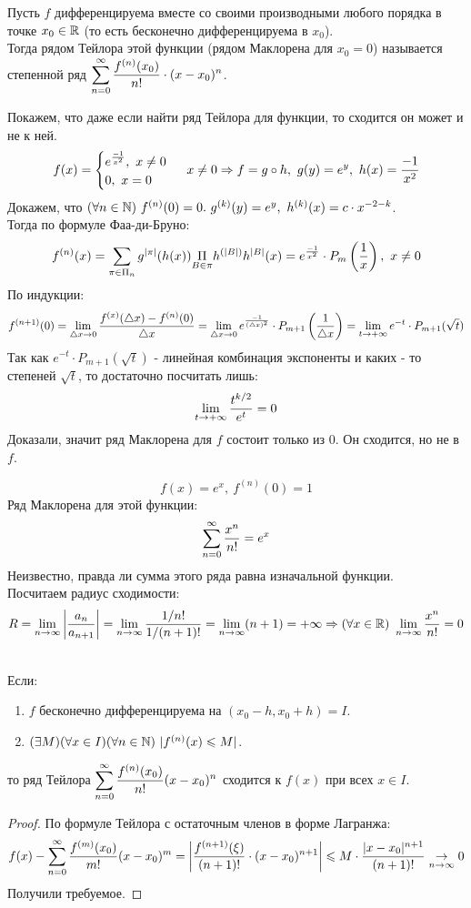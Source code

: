 \begin{definition}
	Пусть $f$ дифференцируема вместе со своими производными любого порядка в точке $x_0\in\mathbb{R}$ (то есть бесконечно дифференцируема в $x_0$). \\
	Тогда рядом Тейлора этой функции (рядом Маклорена для $x_0=0$) называется степенной ряд $\ds\ss[0]\frac{f^{(n)}(x_0)}{n!}\cdot(x-x_0)^n$.
\end{definition}
\begin{example}
	Покажем, что даже если найти ряд Тейлора для функции, то сходится он может и не к ней.
	\[f(x)=
	\begin{cases}
		e^{\frac{-1}{x^2}},\ x\neq0\\
		0,\ x=0
	\end{cases}
	\ x\neq0\Rightarrow f=g\circ h,\ g(y)=e^y,\ h(x)=\frac{-1}{x^2}
	\]
	Докажем, что $(\fa n\in\N)\ f^{(n)}(0)=0.\ g^{(k)}(y)=e^y,\ h^{(k)}(x)=c\cdot x^{-2-k}$.\\
	Тогда по формуле Фаа-ди-Бруно:
	\[f^{(n)}(x)=\sum_{\pi\in\Pi_n}g^{|\pi|}(h(x))\underset{B\in\pi}{\Pi}h^{(|B|)}h^{|B|}(x)=e^{\frac{-1}{x^2}}\cdot P_m\l(\frac1x\r),\ x\neq0\]
	По индукции:
	\begin{multline*}
		f^{(n+1)}(0)=\lim_{\tr x\ra0}\frac{f^{(x)}(\tr x)-f^{(n)}(0)}{\tr x}=\lim_{\tr x\ra0}e^{\frac{-1}{(\tr x)^2}}\cdot P_{m+1}\l(\frac{1}{\tr x}\r)=
		\lim_{t\ra+\i}e^{-t}\cdot P_{m+1}(\sqrt{t})
	\end{multline*}
	Так как $e^{-t}\cdot P_{m+1}(\sqrt{t})$ - линейная комбинация экспоненты и каких - то степеней $\sqrt{t}$, то достаточно посчитать лишь:
	\[\lim_{t\ra+\i}\frac{t^{k/2}}{e^t}=0\]
	Доказали, значит ряд Маклорена для $f$ состоит только из $0$. Он сходится, но не в $f$.
\end{example}
\begin{example}
	\[
	f(x)=e^x,\ f^{(n)}(0)=1
	\]
	Ряд Маклорена для этой функции:
	\[\ss[0]\frac{x^n}{n!}=e^x\]
	Неизвестно, правда ли сумма этого ряда равна изначальной функции.\\
	Посчитаем радиус сходимости:
	\[R=\lim_{n\ra\i}\l|\frac{a_n}{a_{n+1}}\r|=\lim_{n\ra\i}\frac{1/n!}{1/(n+1)!}=\lim_{n\ra\i}(n+1)=+\i\Ra(\fa x\in\R)\ \lim_{n\ra\i}\frac{x^n}{n!}=0\]
\end{example}
\begin{theorem}\label{18_th1}\\
	Если:
	\begin{enumerate}
		\item $f$ бесконечно дифференцируема на $(x_0-h,x_0+h)=I$.
		\item $(\ex M)(\fa x\in I)(\fa n\in\N)\ |f^{(n)}(x)\le M|$.
	\end{enumerate}
	то ряд Тейлора $\ds\ss[0]\frac{f^{(n)}(x_0)}{n!}(x-x_0)^n$ сходится к $f(x)$ при всех $x\in I$.
\end{theorem}
\begin{proof}
	По формуле Тейлора с остаточным членов в форме Лагранжа:
	\[f(x)-\ss[0]\frac{f^{(m)}(x_0)}{m!}(x-x_0)^m=\l|\frac{f^{(n+1)}(\xi)}{(n+1)!}\cdot(x-x_0)^{n+1}\r|\le M\cdot\frac{|x-x_0|^{n+1}}{(n+1)!}\us{n\ra\i}{\ra}0\]
	Получили требуемое.
\end{proof}
